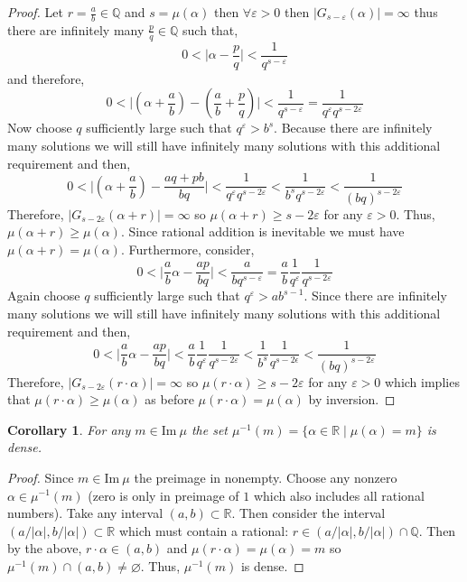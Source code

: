 \documentclass{article}
\newcommand{\Q}{\mathbb{Q}}
\newcommand{\R}{\mathbb{R}}
\renewcommand{\Im}[1]{\mathrm{Im} \: #1}
\theoremstyle{theorem}
\newtheorem{corollary}[theorem]{Corollary}
\theoremstyle{definition}
\theoremstyle{definition}
\theoremstyle{remark}
\theoremstyle{definition}
\theoremstyle{remark}
\begin{document}
\begin{proof}
Let $r = \frac{a}{b} \in \Q$ and $s = \mu(\alpha)$ then $\forall \varepsilon > 0$ then $|G_{s - \varepsilon}(\alpha)| = \infty$ thus there are infinitely many $\frac{p}{q} \in \Q$ such that,
\[ 0 < \Big| \alpha - \frac{p}{q} \Big| < \frac{1}{q^{s - \varepsilon}} \]
and therefore,
\[ 0 < \Big| \left( \alpha + \frac{a}{b} \right) - \left( \frac{a}{b} + \frac{p}{q} \right) \Big| < \frac{1}{q^{s - \varepsilon}} = \frac{1}{q^{\varepsilon} q^{s - 2\varepsilon}}  \]
Now choose $q$ sufficiently large such that $q^{\varepsilon} > b^{s}$. Because there are infinitely many solutions we will still have infinitely many solutions with this additional requirement and then,
\[ 0 < \Big| \left( \alpha + \frac{a}{b} \right) - \frac{aq + pb}{bq} \Big| < \frac{1}{q^{\varepsilon} q^{s - 2\varepsilon}} < \frac{1}{b^s q^{s - 2 \varepsilon}} < \frac{1}{(bq)^{s - 2 \varepsilon}} \]
Therefore, $|G_{s - 2\varepsilon}(\alpha + r)| = \infty$ so $\mu(\alpha +  r) \ge s - 2 \varepsilon$ for any $\varepsilon > 0$. Thus, $\mu(\alpha + r) \ge \mu(\alpha)$. Since rational addition is inevitable we must have $\mu(\alpha + r) = \mu(\alpha)$. Furthermore, consider,
\[ 0 < \Big|  \frac{a}{b} \alpha - \frac{ap}{bq} \Big| < \frac{a}{b q^{s - \varepsilon}} = \frac{a}{b} \frac{1}{q^\varepsilon} \frac{1}{q^{s - 2 \varepsilon}} \] 
Again choose $q$ sufficiently large such that $q^\varepsilon > a b^{s - 1}$. Since there are infinitely many solutions we will still have infinitely many solutions with this additional requirement and then,
\[ 0 < \Big|  \frac{a}{b} \alpha - \frac{ap}{bq} \Big| < \frac{a}{b} \frac{1}{q^\varepsilon} \frac{1}{q^{s - 2 \varepsilon}} < \frac{1}{b^s} \frac{1}{q^{s - 2 \epsilon}} < \frac{1}{(bq)^{s - 2 \varepsilon}} \]
Therefore, $|G_{s - 2\varepsilon}(r \cdot \alpha)| = \infty$ so $\mu(r\cdot \alpha ) \ge s - 2 \varepsilon$ for any $\varepsilon > 0$ which implies that $\mu(r \cdot \alpha ) \ge \mu(\alpha)$ as before $\mu(r \cdot \alpha) = \mu(\alpha)$ by inversion.
\end{proof}


\begin{corollary}
For any $m \in \Im{\mu}$ the set $\mu^{-1}(m) = \{ \alpha \in \R \mid \mu(\alpha) = m \}$ is dense. 
\end{corollary}

\begin{proof}
Since $m \in \Im{\mu}$ the preimage in nonempty. Choose any nonzero $\alpha \in \mu^{-1}(m)$ (zero is only in preimage of $1$ which also includes all rational numbers). Take any interval $(a,b) \subset \R$. Then consider the interval $(a/|\alpha|, b/|\alpha|) \subset \R$ which must contain a rational: $r \in (a/|\alpha|, b/|\alpha|) \cap \Q$. Then by the above, $r \cdot \alpha \in (a, b)$ and $\mu(r \cdot \alpha) = \mu(\alpha) = m$ so $\mu^{-1}(m) \cap (a,b) \neq \varnothing$. Thus, $\mu^{-1}(m)$ is dense.   
\end{proof}
\end{document}
